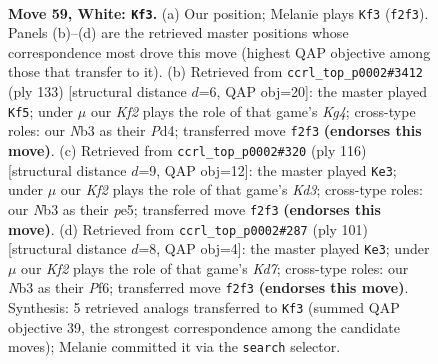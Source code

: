 \documentclass[11pt]{article}
\begin{document}
\clearpage

\begin{figure}[p]\centering
\begin{subfigure}{0.46\textwidth}\centering
\resizebox{\linewidth}{!}{%
\newchessgame
\chessboard[
  setfen={6k1/2P5/2r5/8/5B2/1N6/5K2/8 w - - 31 59},
  showmover=false,
  pgfstyle=straightmove, color=movearrow, markmove={f2-f3}
]}
\caption{}
\end{subfigure}\hfill
\begin{subfigure}{0.46\textwidth}\centering
\resizebox{\linewidth}{!}{%
\newchessgame
\chessboard[
  setfen={1b6/8/8/6k1/3p4/5K2/7p/7R b - - 7 67},
  showmover=false,
  pgfstyle=straightmove, color=movearrow, markmove={g5-f5}
]}
\caption{}
\end{subfigure}
\\[4pt]
\begin{subfigure}{0.46\textwidth}\centering
\resizebox{\linewidth}{!}{%
\newchessgame
\chessboard[
  setfen={8/1B6/P7/2k1p3/r7/3K4/8/8 w - - 11 59},
  showmover=false,
  pgfstyle=straightmove, color=movearrow, markmove={d3-e3}
]}
\caption{}
\end{subfigure}\hfill
\begin{subfigure}{0.46\textwidth}\centering
\resizebox{\linewidth}{!}{%
\newchessgame
\chessboard[
  setfen={8/8/5p2/3p4/3R4/8/1K1k2b1/8 b - - 3 51},
  showmover=false,
  pgfstyle=straightmove, color=movearrow, markmove={d2-e3}
]}
\caption{}
\end{subfigure}
\caption{\textbf{Move 59, White: \texttt{Kf3}.} (a) Our position; Melanie plays \texttt{Kf3} (\texttt{f2f3}). Panels (b)--(d) are the retrieved master positions whose correspondence most drove this move (highest QAP objective among those that transfer to it). (b) Retrieved from \texttt{ccrl\_top\_p0002\#3412} (ply 133) [structural distance $d$=6, QAP obj=20]: the master played \texttt{Kf5}; under $\mu$ our \emph{Kf2} plays the role of that game's \emph{Kg4}; cross-type roles: our \emph{N}b3 as their \emph{P}d4; transferred move \texttt{f2f3} \textbf{(endorses this move)}. (c) Retrieved from \texttt{ccrl\_top\_p0002\#320} (ply 116) [structural distance $d$=9, QAP obj=12]: the master played \texttt{Ke3}; under $\mu$ our \emph{Kf2} plays the role of that game's \emph{Kd3}; cross-type roles: our \emph{N}b3 as their \emph{p}e5; transferred move \texttt{f2f3} \textbf{(endorses this move)}. (d) Retrieved from \texttt{ccrl\_top\_p0002\#287} (ply 101) [structural distance $d$=8, QAP obj=4]: the master played \texttt{Ke3}; under $\mu$ our \emph{Kf2} plays the role of that game's \emph{Kd7}; cross-type roles: our \emph{N}b3 as their \emph{P}f6; transferred move \texttt{f2f3} \textbf{(endorses this move)}. Synthesis: 5 retrieved analogs transferred to \texttt{Kf3} (summed QAP objective 39, the strongest correspondence among the candidate moves); Melanie committed it via the \texttt{search} selector.}
\label{fig:thought-m116}
\end{figure}
\end{document}
